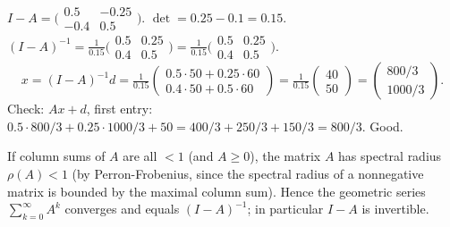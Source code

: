 \begin{solutions}
  \item $I - A = \bigl(\begin{smallmatrix} 0.5 & -0.25 \\ -0.4 & 0.5 \end{smallmatrix}\bigr)$.
        $\det = 0.25 - 0.1 = 0.15$.
        $(I - A)^{-1} = \tfrac{1}{0.15} \bigl(\begin{smallmatrix} 0.5 & 0.25 \\ 0.4 & 0.5 \end{smallmatrix}\bigr) = \tfrac{1}{0.15}\bigl(\begin{smallmatrix} 0.5 & 0.25 \\ 0.4 & 0.5 \end{smallmatrix}\bigr)$.
        \[
        x = (I - A)^{-1} d = \tfrac{1}{0.15}\begin{pmatrix} 0.5 \cdot 50 + 0.25 \cdot 60 \\ 0.4 \cdot 50 + 0.5 \cdot 60 \end{pmatrix} = \tfrac{1}{0.15}\begin{pmatrix} 40 \\ 50 \end{pmatrix} = \begin{pmatrix} 800/3 \\ 1000/3 \end{pmatrix}.
        \]
        Check: $A x + d$, first entry:
        $0.5 \cdot 800/3 + 0.25 \cdot 1000/3 + 50 = 400/3 + 250/3 + 150/3 = 800/3$.
        Good.

  \item If column sums of $A$ are all $< 1$ (and $A \ge 0$), the matrix $A$
        has spectral radius $\rho(A) < 1$ (by Perron-Frobenius, since the
        spectral radius of a nonnegative matrix is bounded by the maximal
        column sum). Hence the geometric series
        $\sum_{k = 0}^{\infty} A^{k}$ converges and equals $(I - A)^{-1}$;
        in particular $I - A$ is invertible.


\end{solutions}
